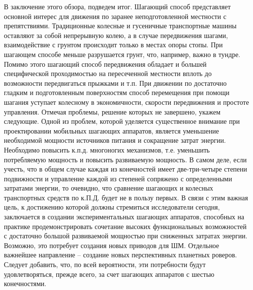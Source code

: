 В заключение этого обзора, подведем итог. Шагающий способ представляет основной интерес для движения по заранее неподготовленной местности с препятствиями. Традиционные колесные и гусеничные транспортные машины оставляют за собой непрерывную колею, а в случае передвижения шагами, взаимодействие с грунтом происходит только в местах опоры стопы. При шагающем способе меньше разрушается грунт, что, например, важно в тундре. Помимо этого шагающий способ передвижения обладает и большей специфической проходимостью на пересеченной местности вплоть до возможности передвигаться прыжками и т.п. При движении по достаточно гладким и подготовленным поверхностям способ перемещения при помощи шагания уступает колесному в экономичности, скорости передвижения и простоте управления.
Отмечая проблемы, решение которых не завершено, укажем следующие. Одной из проблем, которой уделяется существенное внимание при проектировании мобильных шагающих аппаратов, является уменьшение необходимой мощности источников питания и сокращение затрат энергии. Необходимо повысить к.п.д. многоногих механизмов, т.е. уменьшить потребляемую мощность и повысить развиваемую мощность. В самом деле, если учесть, что в общем случае каждая из конечностей имеет две-три-четыре степени подвижности и управление каждой из степеней сопряжено с определенными затратами энергии, то очевидно, что сравнение шагающих и колесных транспортных средств по к.П.Д. будет не в пользу первых. В связи с этим важная цель, к достижению которой должны стремиться исследователи сегодня, заключается в создании экспериментальных шагающих аппаратов, способных на практике продемонстрировать сочетание высоких функциональных возможностей с достаточно большой развиваемой мощностью при сниженных затратах энергии. Возможно, это потребует создания новых приводов для ШМ.
Отдельное важнейшее направление – создание новых перспективных планетных роверов. Следует добавить, что, по всей вероятности, эти потребности будут удовлетворяться, прежде всего, за счет шагающих аппаратов с шестью конечностями.

